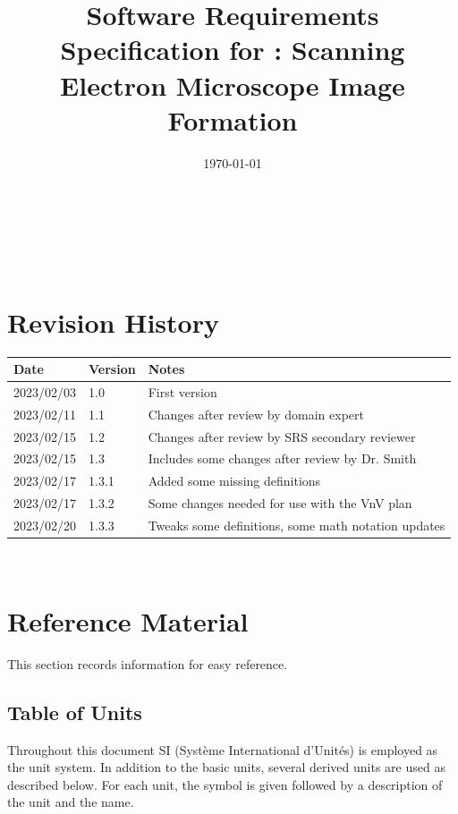 \documentclass[12pt]{article}
\begin{document}

\title{Software Requirements Specification for \progname: Scanning Electron Microscope Image Formation} 
\author{\authname}
\date{\today}
	
\maketitle

~\newpage


\tableofcontents

~\newpage

\section*{Revision History}

\begin{tabularx}{\textwidth}{p{3cm}p{2cm}X}
\toprule {\bf Date} & {\bf Version} & {\bf Notes}\\
\midrule
2023/02/03 & 1.0 & First version\\
2023/02/11 & 1.1 & Changes after review by domain expert\\
2023/02/15 & 1.2 & Changes after review by SRS secondary reviewer\\
2023/02/15 & 1.3 & Includes some changes after review by Dr. Smith\\
2023/02/17 & 1.3.1 & Added some missing definitions\\
2023/02/17 & 1.3.2 & Some changes needed for use with the VnV plan\\
2023/02/20 & 1.3.3 & Tweaks some definitions, some math notation updates\\
\bottomrule
\end{tabularx}

~\newpage

\section{Reference Material}

This section records information for easy reference.

\subsection{Table of Units}

Throughout this document SI (Syst\`{e}me International d'Unit\'{e}s) is employed
as the unit system. In addition to the basic units, several derived units are
used as described below. For each unit, the symbol is given followed by a
description of the unit and the name.
~\newline
\end{document}

